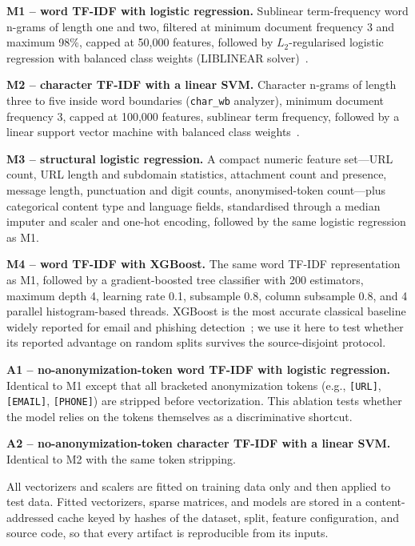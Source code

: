 \documentclass[conference]{IEEEtran}
\begin{document}
\textbf{M1 -- word TF-IDF with logistic regression.} Sublinear term-frequency word n-grams of length one and two, filtered at minimum document frequency 3 and maximum 98\%, capped at 50,000 features, followed by $L_2$-regularised logistic regression with balanced class weights (LIBLINEAR solver)~\cite{salton_buckley,liblinear}.

\textbf{M2 -- character TF-IDF with a linear SVM.} Character n-grams of length three to five inside word boundaries (\texttt{char\_wb} analyzer), minimum document frequency 3, capped at 100,000 features, sublinear term frequency, followed by a linear support vector machine with balanced class weights~\cite{liblinear}.

\textbf{M3 -- structural logistic regression.} A compact numeric feature set---URL count, URL length and subdomain statistics, attachment count and presence, message length, punctuation and digit counts, anonymised-token count---plus categorical content type and language fields, standardised through a median imputer and scaler and one-hot encoding, followed by the same logistic regression as M1.

\textbf{M4 -- word TF-IDF with XGBoost.} The same word TF-IDF representation as M1, followed by a gradient-boosted tree classifier with 200 estimators, maximum depth 4, learning rate 0.1, subsample 0.8, column subsample 0.8, and 4 parallel histogram-based threads. XGBoost is the most accurate classical baseline widely reported for email and phishing detection~\cite{chen_xgboost}; we use it here to test whether its reported advantage on random splits survives the source-disjoint protocol.

\textbf{A1 -- no-anonymization-token word TF-IDF with logistic regression.} Identical to M1 except that all bracketed anonymization tokens (e.g., \texttt{[URL]}, \texttt{[EMAIL]}, \texttt{[PHONE]}) are stripped before vectorization. This ablation tests whether the model relies on the tokens themselves as a discriminative shortcut.

\textbf{A2 -- no-anonymization-token character TF-IDF with a linear SVM.} Identical to M2 with the same token stripping.

All vectorizers and scalers are fitted on training data only and then applied to test data. Fitted vectorizers, sparse matrices, and models are stored in a content-addressed cache keyed by hashes of the dataset, split, feature configuration, and source code, so that every artifact is reproducible from its inputs.
\end{document}
